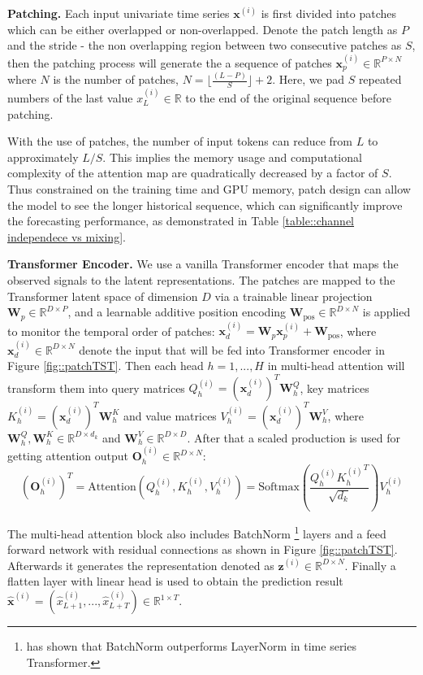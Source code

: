 \documentclass{article} \usepackage{iclr2023_conference,times}
\def\vx{{\bm{x}}}
\def\vz{{\bm{z}}}
\newcommand{\R}{\mathbb{R}}
\begin{document}
\textbf{Patching.} Each input univariate time series $\vx^{(i)}$ is first divided into patches which can be either overlapped or non-overlapped. Denote the patch length as $P$ and the stride - the non overlapping region between two consecutive patches as $S$, then the patching process will generate the a sequence of patches $\vx^{(i)}_p \in \R^{P \times N}$ where $N$ is the number of patches, $N = \lfloor \frac{(L-P)}{S} \rfloor + 2$. Here, we pad $S$ repeated numbers of the last value $x_L^{(i)}\in \R$ to the end of the original sequence before patching. 

With the use of patches, the number of input tokens can reduce from $L$ to approximately $L/S$. This implies the memory usage and computational complexity of the attention map are quadratically decreased by a factor of $S$. Thus constrained on the training time and GPU memory, patch design can allow the model to see the longer historical sequence, which can significantly improve the forecasting performance, as demonstrated in Table \ref{table::channel independece vs mixing}.

\textbf{Transformer Encoder.} We use a vanilla Transformer encoder that maps the observed signals to the latent representations. The patches are mapped to the Transformer latent space of dimension $D$ via a trainable linear projection $\mathbf{W}_p\in \R^{D \times P}$, and a learnable additive position encoding $\mathbf{W}_{\text{pos}}\in \R^{D \times N}$ is applied to monitor the temporal order of patches: $\vx^{(i)}_d = \mathbf{W}_p \vx^{(i)}_p + \mathbf{W}_{\text{pos}}$, where $\vx^{(i)}_d \in \R^{D \times N}$ denote the input that will be fed into Transformer encoder in Figure \ref{fig::patchTST}. Then each head $h=1,...,H$ in multi-head attention will transform them into query matrices $Q^{(i)}_h=(\vx^{(i)}_d)^T\mathbf{W}^Q_h$, key matrices $ K^{(i)}_h=(\vx^{(i)}_d)^T\mathbf{W}^K_h$ and value matrices $V^{(i)}_h=(\vx^{(i)}_d)^T\mathbf{W}^V_h$, where $\mathbf{W}^Q_h,\mathbf{W}^K_h \in \R^{D \times d_k}$ and $\mathbf{W}^V_h \in \R^{D \times D}$. After that a scaled production is used for getting attention output $\mathbf{O}^{(i)}_h\in \R^{D \times N}$:
$$
(\mathbf{O}^{(i)}_h)^T = \text{Attention}(Q^{(i)}_h,K^{(i)}_h,V^{(i)}_h) = \text{Softmax} (\frac{{Q^{(i)}_h}{K^{(i)}_h}^T}{\sqrt{d_k}})V^{(i)}_h
$$

The multi-head attention block also includes BatchNorm \footnote{\citet{tst} has shown that BatchNorm outperforms LayerNorm in time series Transformer.} layers and a feed forward network with residual connections as shown in Figure \ref{fig::patchTST}. Afterwards it generates the representation denoted as $\vz^{(i)} \in \R^{D \times N}$. Finally a flatten layer with linear head is used to obtain the prediction result $\hat{\vx}^{(i)}= (\hat{x}^{(i)}_{L+1},..., \hat{x}^{(i)}_{L+T}) \in \R^{1 \times T}$.
\end{document}
